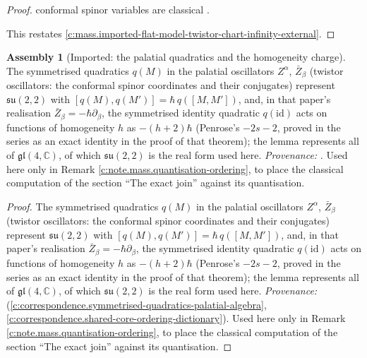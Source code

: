 \documentclass[11pt]{article}
\theoremstyle{definition}
\newtheorem{assembled}[theorem]{Assembly}
\theoremstyle{plain}
\newcommand{\changedmark}[2]{\marginpar{\raggedright\scriptsize\color{#1}#2}}
\providecommand{\C}{}\renewcommand{\C}{\mathbb{C}}
\begin{document}
\begin{proof}
conformal spinor variables are classical \cite{PenroseRindler1986, Hughston1979}.

This restates \ref{c:mass.imported-flat-model-twistor-chart-infinity-external}.

\end{proof}

\begin{assembled}[Imported: the palatial quadratics and the homogeneity charge]\label{c:mass.imported-palatial-quadratics-homogeneity-charge}
\changedmark{gray}{reworded}
The symmetrised quadratics $q(M)$ in the palatial oscillators $Z^\alpha$, $\bar Z_\beta$ (twistor oscillators: the conformal spinor coordinates and their conjugates) represent $\mathfrak{su}(2,2)$ with $[q(M), q(M')] = \hbar\, q([M,M'])$, and, in that paper's realisation $\bar{Z}_{\beta} = -\hbar\partial_{\beta}$, the symmetrised identity quadratic $q(\mathrm{id})$ acts on functions of homogeneity $h$ as $-(h+2)\hbar$ (Penrose's $-2s-2$, proved in the series as an exact identity in the proof of that theorem); the lemma represents all of $\mathfrak{gl}(4,\C)$, of which $\mathfrak{su}(2,2)$ is the real form used here. \emph{Provenance:} \cite[Lem.~5.5, Thm.~5.7]{ButlerT9}. Used here only in Remark \ref{c:note.mass.quantisation-ordering}, to place the classical computation of the section ``The exact join'' against its quantisation.
\end{assembled}
\begin{proof}
The symmetrised quadratics $q(M)$ in the palatial oscillators $Z^\alpha$, $\bar Z_\beta$ (twistor oscillators: the conformal spinor coordinates and their conjugates) represent $\mathfrak{su}(2,2)$ with $[q(M), q(M')] = \hbar\, q([M,M'])$, and, in that paper's realisation $\bar{Z}_{\beta} = -\hbar\partial_{\beta}$, the symmetrised identity quadratic $q(\mathrm{id})$ acts on functions of homogeneity $h$ as $-(h+2)\hbar$ (Penrose's $-2s-2$, proved in the series as an exact identity in the proof of that theorem); the lemma represents all of $\mathfrak{gl}(4,\C)$, of which $\mathfrak{su}(2,2)$ is the real form used here. \emph{Provenance:} \cite[Lem.~5.5, Thm.~5.7]{ButlerT9} (\ref{c:correspondence.symmetrised-quadratics-palatial-algebra}, \ref{c:correspondence.shared-core-ordering-dictionary}). Used here only in Remark \ref{c:note.mass.quantisation-ordering}, to place the classical computation of the section ``The exact join'' against its quantisation.

\end{proof}
\end{document}

